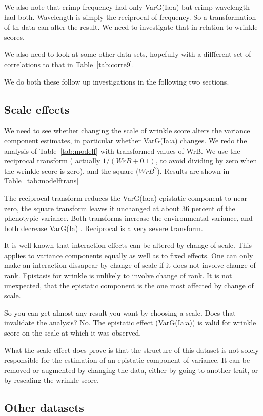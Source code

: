 \documentclass[titlepage]{article}  %
\begin{document}
We also note that crimp frequency had only VarG(Ia:a) but crimp wavelength had both. Wavelength is simply the reciprocal of frequency. So a transformation of th data can alter the result. We need to investigate that in relation to wrinkle scores. 

We also need to look at some other data sets, hopefully with a diffferent set of correlations to that in Table~\ref{tab:corre9}.
 
We do both these follow up investigations in the following two sections.

\subsection{Scale effects}
We need to see whether changing the scale of wrinkle score alters the variance component estimates, in particular whether VarG(Ia:a) changes. We redo the analysis of Table~\ref{tab:modelf} with transformed values of WrB. We use the reciprocal transform ( actually $1/(WrB + 0.1)$, to avoid dividing by zero when the wrinkle score is zero), and the square ($WrB^{2}$). Results are shown in Table~\ref{tab:modelftrans}

The reciprocal transform reduces the VarG(Ia:a) epistatic component to near zero, the square transform leaves it unchanged at about 36 percent of the phenotypic variance.  Both transforms increase the environmental variance, and both decrease VarG(Ia) .  Reciprocal is a very severe transform.

It is well known that interaction effects can be altered by change of scale. This applies to variance components equally as well as to fixed effects. One can only make an interaction dissapear by change of scale if it does not involve change of rank. Epistasis for wrinkle is unlikely to involve change of rank. It is not unexpected, that the epistatic component is the one most affected by change of scale. 

So you can get  almost any result you want by choosing a scale. Does that invalidate the analysis? No. The epistatic effect (VarG(Ia:a)) is valid for wrinkle score on the scale at which it was observed.  

What the scale effect does prove is that the structure of this dataset is not solely responsible for the estimation of an epistatic component of variance. It can be removed or augmented by changing the data, either by going to another trait, or by rescaling the wrinkle score.

\subsection{Other datasets}
\end{document}
